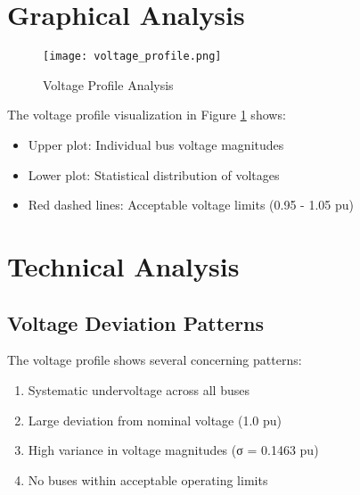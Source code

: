 \documentclass[11pt]{article}
\begin{document}
\section{Graphical Analysis}
\begin{figure}[H]
    \centering
    \texttt{[image: voltage\_profile.png]}
    \caption{Voltage Profile Analysis}
    \label{fig:voltage_profile}
\end{figure}

The voltage profile visualization in Figure \ref{fig:voltage_profile} shows:
\begin{itemize}
    \item Upper plot: Individual bus voltage magnitudes
    \item Lower plot: Statistical distribution of voltages
    \item Red dashed lines: Acceptable voltage limits (0.95 - 1.05 pu)
\end{itemize}

\section{Technical Analysis}
\subsection{Voltage Deviation Patterns}
The voltage profile shows several concerning patterns:
\begin{enumerate}
    \item Systematic undervoltage across all buses
    \item Large deviation from nominal voltage (1.0 pu)
    \item High variance in voltage magnitudes (σ = 0.1463 pu)
    \item No buses within acceptable operating limits
\end{enumerate}
\end{document}
